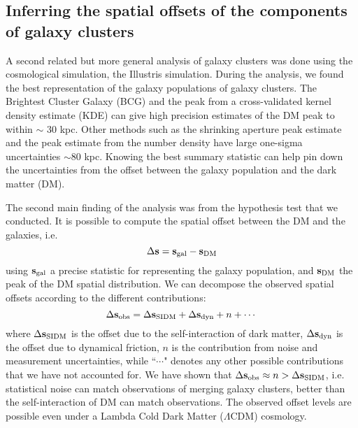 \subsection{Inferring the spatial offsets of the components of galaxy clusters}
A second related but more general analysis of galaxy clusters was done using the
cosmological simulation, the Illustris simulation. 
During the analysis, we found the best 
representation of the galaxy populations of galaxy clusters. 
The Brightest Cluster
Galaxy (BCG) and the peak from a cross-validated kernel density estimate (KDE)
can give high precision estimates of the DM peak to within $\sim$ 30 kpc.
Other methods such as the shrinking aperture peak estimate and the peak estimate 
from the number density have large one-sigma uncertainties $\sim 80$ kpc.   
Knowing the best summary statistic can help pin down the uncertainties from  
the offset between the galaxy population and the dark matter (DM).

The second main finding of the analysis was from the hypothesis test that we
conducted.
It is possible to compute the spatial 
offset between the DM and the galaxies, i.e.
\begin{equation}
	\Delta {\bf s} =  {\bf s}_{\rm gal} - {\bf s}_{\rm DM}
\end{equation}
using ${\bf s}_{\rm gal}$ a precise statistic for representing the galaxy population,
and ${\bf s}_{\rm DM}$ the peak of the DM spatial distribution.
We can decompose the observed spatial offsets according to the different
contributions: 
\begin{equation}
	\Delta {\bf s}_{\rm obs} = \Delta {\bf s}_{\mathrm{SIDM}} + \Delta {\bf s}_{\rm dyn} + n + \cdots
\end{equation}
where $\Delta {\bf s}_{\mathrm{SIDM}}$ is the offset due to the self-interaction of dark matter, 
$\Delta {\bf s}_{\rm dyn}$ is the offset due to dynamical friction, $n$ is the
contribution from noise and measurement uncertainties, while ``$\cdots$" denotes
any other possible contributions that we have not accounted for. 
We have shown that $\Delta {\bf s}_{\rm obs} \approx  n > \Delta {\bf s}_{\mathrm{SIDM}}$, i.e. 
statistical noise can match observations of merging galaxy clusters, better than 
the self-interaction of DM can match observations. 
The observed offset levels are possible even under  
a Lambda Cold Dark Matter ($\Lambda$CDM) cosmology. 


